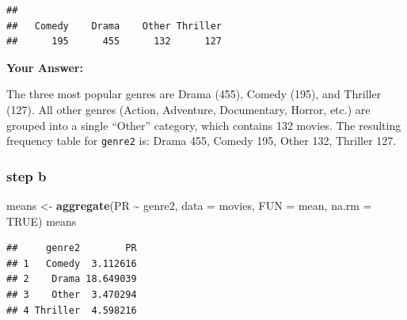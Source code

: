 \documentclass[
]{article}
\newenvironment{Shaded}{\begin{snugshade}}{\end{snugshade}}
\newcommand{\AttributeTok}[1]{\textcolor[rgb]{0.13,0.29,0.53}{#1}}
\newcommand{\ConstantTok}[1]{\textcolor[rgb]{0.56,0.35,0.01}{#1}}
\newcommand{\DecValTok}[1]{\textcolor[rgb]{0.00,0.00,0.81}{#1}}
\newcommand{\FunctionTok}[1]{\textcolor[rgb]{0.13,0.29,0.53}{\textbf{#1}}}
\newcommand{\NormalTok}[1]{#1}
\newcommand{\OtherTok}[1]{\textcolor[rgb]{0.56,0.35,0.01}{#1}}
\newcommand{\SpecialCharTok}[1]{\textcolor[rgb]{0.81,0.36,0.00}{\textbf{#1}}}
\newcommand{\StringTok}[1]{\textcolor[rgb]{0.31,0.60,0.02}{#1}}
\begin{document}
\begin{Shaded}
\end{Shaded}

\begin{verbatim}
## 
##   Comedy    Drama    Other Thriller 
##      195      455      132      127
\end{verbatim}

\textbf{Your Answer:}

The three most popular genres are Drama (455), Comedy (195), and
Thriller (127). All other genres (Action, Adventure, Documentary,
Horror, etc.) are grouped into a single ``Other'' category, which
contains 132 movies. The resulting frequency table for \texttt{genre2}
is: Drama 455, Comedy 195, Other 132, Thriller 127.

\subsubsection{step b}\label{step-b}

\begin{Shaded}
\begin{Highlighting}[]
\NormalTok{means }\OtherTok{\textless{}{-}} \FunctionTok{aggregate}\NormalTok{(PR }\SpecialCharTok{\textasciitilde{}}\NormalTok{ genre2, }\AttributeTok{data =}\NormalTok{ movies, }\AttributeTok{FUN =}\NormalTok{ mean, }\AttributeTok{na.rm =} \ConstantTok{TRUE}\NormalTok{)}
\NormalTok{means}
\end{Highlighting}
\end{Shaded}

\begin{verbatim}
##     genre2        PR
## 1   Comedy  3.112616
## 2    Drama 18.649039
## 3    Other  3.470294
## 4 Thriller  4.598216
\end{verbatim}
\end{document}
